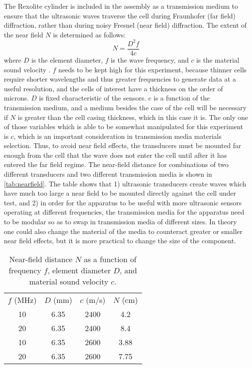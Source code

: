 The Rexolite cylinder is included in the assembly as a transmission medium to ensure that the ultrasonic waves traverse the cell during Fraunhofer (far field) diffraction, rather than during noisy Fresnel (near field) diffraction. The extent of the near field $N$ is determined as follows:
$$\label{eq:nearfield} N= \frac{D^2 f} {4c} $$
where $D$ is the element diameter, $f$ is the wave frequency, and $c$ is the material sound velocity \cite{OLYMPUS}.
$f$ needs to be kept high for this experiment, because thinner cells require shorter wavelengths and thus greater frequencies to generate data at a useful resolution, and the cells of interest have a thickness on the order of microns. $D$ is fixed characteristic of the sensors. $c$ is a function of the transmission medium, and a medium besides the case of the cell will be necessary if $N$ is greater than the cell casing thickness, which in this case it is. The only one of those variables which is able to be somewhat manipulated for this experiment is $c$, which is an important consideration in transmission media materials selection. 
Thus, to avoid near field effects, the transducers must be mounted far enough from the cell that the wave does not enter the cell until after it has entered the far field regime. The near-field distance for combinations of two different transducers and two different transmission media is shown in \autoref{tab:nearfield}. The table shows that 1) ultrasonic transducers create waves which have much too large a near field to be mounted directly against the cell under test, and 2) in order for the apparatus to be useful with more ultrasonic sensors operating at different frequencies, the transmission media for the apparatus need to be modular so as to swap in transmission media of different sizes. In theory one could also change the material of the media to counteract greater or smaller near field effects, but it is more practical to change the size of the component. 

\begin{table}[h]
    \centering
    \begin{tabular}{c|c|c|c}
         $f$ (MHz) & $D$ (mm) & $c$ (m/s) & $N$ (cm) \\
         10 & 6.35 & 2400 & 4.2 \\
         20 & 6.35 & 2400 & 8.4 \\
         10 & 6.35 & 2600 & 3.88 \\
         20 & 6.35 & 2600 & 7.75 \\
    \end{tabular}
    \caption{Near-field distance $N$ as a function of frequency $f$, element diameter $D$, and material sound velocity $c$.}
    \label{tab:nearfield}
\end{table}


